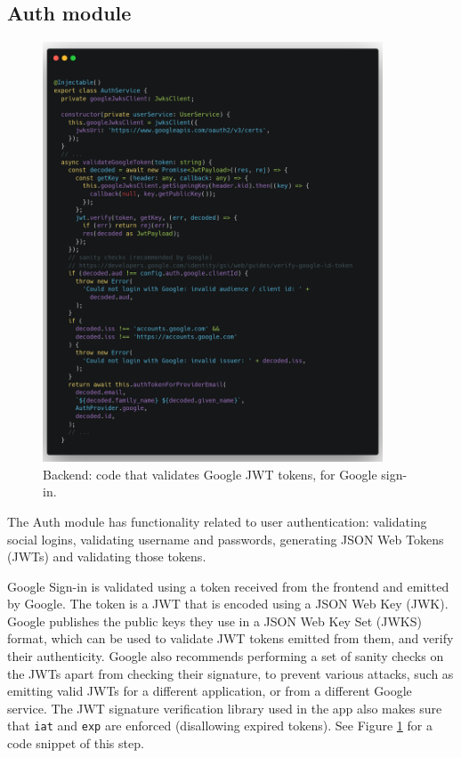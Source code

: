 \subsection{Auth module}

\begin{figure}[htbp]
    \centering
    \includegraphics[width=0.9\textwidth]{./figures/code/be_auth-service-google.png}
    \caption{Backend: code that validates Google JWT tokens, for Google sign-in.}
    \label{FigBeAuthServiceGoogle}
\end{figure}

The Auth module has functionality related to user authentication: validating social logins, validating username and passwords, generating JSON Web Tokens (JWTs) and validating those tokens.

Google Sign-in is validated using a token received from the frontend and emitted by Google. The token is a JWT that is encoded using a JSON Web Key (JWK). Google publishes the public keys they use in a JSON Web Key Set (JWKS) format, which can be used to validate JWT tokens emitted from them, and verify their authenticity. Google also recommends performing a set of sanity checks on the JWTs apart from checking their signature, to prevent various attacks, such as emitting valid JWTs for a different application, or from a different Google service. The JWT signature verification library used in the app also makes sure that \verb|iat| and \verb|exp| are enforced (disallowing expired tokens). See Figure \ref{FigBeAuthServiceGoogle} for a code snippet of this step.

